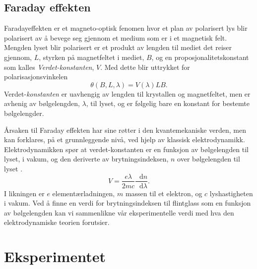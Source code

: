 \documentclass[%
 reprint,
 amsmath,amssymb,
 aps,
]{revtex4-1}
\newcommand*\diff{\mathop{}\!\mathrm{d}}
\begin{document}
\subsection{Faraday effekten}
Faradayeffekten er et magneto-optisk fenomen hvor et plan av polarisert lys blir polarisert av å bevege seg gjennom et medium som er i et magnetisk felt. Mengden lyset blir polarisert er et produkt av lengden til mediet det reiser gjennom, $L$, styrken på magnetfeltet i mediet, $B$, og en proposjonalitetskonstant som kalles \textit{Verdet-konstanten}, $V$. Med dette blir uttrykket for polarisasjonsvinkelen
\begin{equation}
  \theta\left(B, L, \lambda\right) = V\left(\lambda\right)LB.\label{verdet}
\end{equation}
Verdet-\textit{konstanten} er uavhengig av lengden til krystallen og magnetfeltet, men er avhenig av bølgelengden, $\lambda$, til lyset, og er følgelig bare en konstant for bestemte bølgelengder. \par
Årsaken til Faraday effekten har sine røtter i den kvantemekaniske verden, men kan forklares, på et grunnleggende nivå, ved hjelp av klassisk elektrodynamikk. Elektrodynamikken spør at verdet-konstanten er en funksjon av bølgelengden til lyset, i vakum, og den deriverte av brytningsindeksen, $n$ over bølgelengden til lyset \cite{pedrotti_faraday_1990}.
\begin{equation}
  V = \frac{e\lambda}{2mc} \frac{\diff n}{\diff\lambda}.
\end{equation}
I likningen er $e$ elementærladningen, $m$ massen til et elektron, og $c$ lyshastigheten i vakum. Ved å finne en verdi for brytningsindeksen til flintglass som en funksjon av bølgelengden kan vi sammenlikne vår eksperimentelle verdi med hva den elektrodynamiske teorien forutsier.
\section{\label{sec:level3}Eksperimentet}
\end{document}
